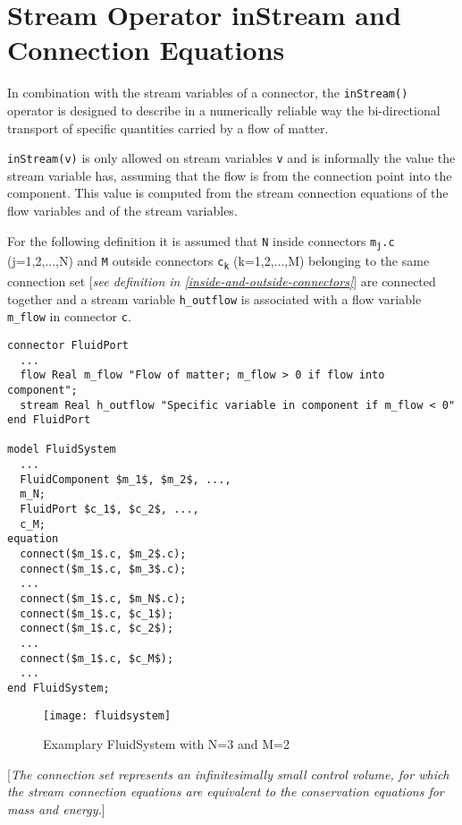 \section{Stream Operator inStream and Connection Equations}

In combination with the stream variables of a connector, the
\lstinline!inStream()! operator is designed to describe in a numerically
reliable way the bi-directional transport of specific quantities carried
by a flow of matter.

\lstinline!inStream(v)! is only allowed on stream variables \lstinline!v! and is
informally the value the stream variable has, assuming that the flow is
from the connection point into the component. This value is computed
from the stream connection equations of the flow variables and of the
stream variables.

For the following definition it is assumed that \lstinline!N! inside connectors
\texttt{m\textsubscript{j}.c} (j=1,2,...,N) and \lstinline!M! outside connectors
\texttt{c\textsubscript{k}} (k=1,2,...,M) belonging to the same connection set
{[}\emph{see definition in \autoref{inside-and-outside-connectors}}{]} are connected
together and a stream variable \lstinline!h_outflow! is associated with a flow
variable \lstinline!m_flow! in connector \lstinline!c!.

\begin{lstlisting}[language=modelica,mathescape=true]
connector FluidPort
  ...
  flow Real m_flow "Flow of matter; m_flow > 0 if flow into component";
  stream Real h_outflow "Specific variable in component if m_flow < 0"
end FluidPort

model FluidSystem
  ...
  FluidComponent $m_1$, $m_2$, ...,
  m_N;
  FluidPort $c_1$, $c_2$, ...,
  c_M;
equation
  connect($m_1$.c, $m_2$.c);
  connect($m_1$.c, $m_3$.c);
  ...
  connect($m_1$.c, $m_N$.c);
  connect($m_1$.c, $c_1$);
  connect($m_1$.c, $c_2$);
  ...
  connect($m_1$.c, $c_M$);
  ...
end FluidSystem;
\end{lstlisting}
\begin{figure}[H]
\caption{Examplary FluidSystem with N=3 and M=2}
\begin{center}
\texttt{[image: fluidsystem]}
\end{center}
\end{figure}

{[}\emph{The connection set represents an infinitesimally small control
volume, for which the stream connection equations are equivalent to the
conservation equations for mass and energy.}{]}

